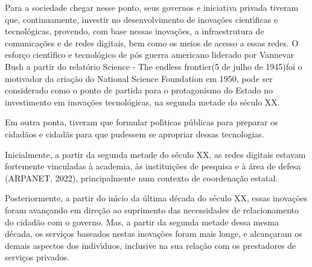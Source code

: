 \documentclass[
12pt,		%
openright,	%
twoside,  %
a4paper,			%
chapter=TITLE,		%
english,			%
french,				%
spanish,			%
brazil				%
]{USPSC-classe/USPSC}
\begin{document}
Para a sociedade chegar nesse ponto, seus governos e iniciativa privada tiveram que, continuamente, investir no desenvolvimento de inova\c{c}\~oes cient\'{\i}ficas e tecnol\'ogicas,  provendo, com base nessas inova\c{c}\~oes, a infraestrutura de comunica\c{c}\~oes e de redes digitais, bem como os meios de acesso a essas redes. O esfor\c{c}o cient\'{\i}fico e tecnol\'ogico de p\'os guerra americano liderado por Vannevar Bush a partir do relat\'orio \textquotedbl Science - The endless frontier\textquotedbl (5 de julho de 1945)foi o motivador da cria\c{c}\~ao do National Science Foundation em 1950, pode ser considerado como o ponto de partida para o protagonismo do Estado no investimento em inova\c{c}\~oes tecnol\'ogicas, na segunda metade do s\'eculo XX.

















Em outra ponta, tiveram que formular pol\'{\i}ticas p\'ublicas para preparar os cidad\~aos e cidad\~as para que pudessem se apropriar dessas tecnologias.

















Inicialmente, a partir da segunda metade do s\'eculo XX, as redes digitais estavam fortemente vinculadas \`a academia, \`as institui\c{c}\~oes de pesquisa e \`a \'area de defesa  (ARPANET, 2022), principalmente num contexto de coordena\c{c}\~ao estatal.

















Posteriormente, a partir do in\'{\i}cio da \'ultima d\'ecada do s\'eculo XX, essas inova\c{c}\~oes  foram avan\c{c}ando em dire\c{c}\~ao ao suprimento das necessidades de relacionamento do cidad\~ao com o governo. Mas, a partir da segunda metade dessa mesma d\'ecada, os servi\c{c}os baseados nestas inova\c{c}\~oes foram mais longe, e alcan\c{c}aram  os demais aspectos dos indiv\'{\i}duos, inclusive na sua rela\c{c}\~ao com os prestadores de servi\c{c}os privados.
\end{document}
